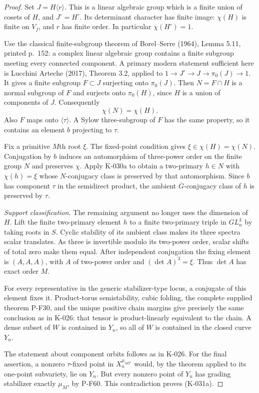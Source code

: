 \begin{proof}
Set $J=H\langle r\rangle$.  This is a linear algebraic group
which is a finite union of cosets of $H$, and $J^\circ=H^\circ$.
Its determinant character has finite image: $\chi(H)$ is finite
on $V_f$, and $r$ has finite order.  In particular
$\chi(H^\circ)=1$.

Use the classical finite-subgroup theorem of Borel--Serre
(1964), Lemma 5.11, printed p.~152: a complex linear algebraic
group contains a finite subgroup meeting every connected
component.  A primary modern statement sufficient
here is Lucchini Arteche (2017), Theorem 3.2, applied to
$1\to J^\circ\to J\to\pi_0(J)\to1$.  It gives a finite
subgroup $F\subset J$ surjecting onto $\pi_0(J)$.
Then $N=F\cap H$ is a normal subgroup of $F$ and surjects onto
$\pi_0(H)$, since $H$ is a union of components of $J$.
Consequently
\[
                       \chi(N)=\chi(H).
                                                        \tag{K-031b}
\]
Also $F$ maps onto $\langle\tau\rangle$.  A Sylow
three-subgroup of $F$ has the same property, so it contains
an element $b$ projecting to $\tau$.

Fix a primitive $M$th root $\xi$.  The fixed-point condition
gives $\xi\in\chi(H)=\chi(N)$.  Conjugation by $b$ induces
an automorphism of three-power order on the finite group $N$
and preserves $\chi$.  Apply K-030a to obtain a two-primary
$h\in N$ with $\chi(h)=\xi$ whose $N$-conjugacy class is
preserved by that automorphism.  Since $b$ has component $\tau$
in the semidirect product, the ambient $\overline G$-conjugacy
class of $h$ is preserved by $\tau$.

\emph{Support classification.}
The remaining argument no longer uses the dimension of $H$.
Lift the finite two-primary element $h$ to a finite two-primary
triple in $GL_n^3$ by taking roots in $S$.  Cyclic stability
of its ambient class makes its three spectra scalar translates.
As three is invertible modulo its two-power order, scalar shifts
of total zero make them equal.  After independent conjugation
the fixing element is $(A,A,A)$, with $A$ of two-power order
and $(\det A)^3=\xi$.  Thus $\det A$ has exact order $M$.

For every representative in the generic stabilizer-type locus,
a conjugate of this element fixes it.  Product-torus
semistability, cubic folding, the complete supplied theorem
P-F30, and the unique positive chain margins give precisely
the same conclusion as in K-026: that tensor is product-linearly
equivalent to the chain.  A dense subset of $W$ is contained
in $Y_n$, so all of $W$ is contained in the closed curve $Y_n$.

The statement about component orbits follows as in K-026.
For the final assertion, a nonzero $\tau$-fixed point in
$X_n^{\mu_{M3^a}}$ would, by the theorem applied to its one-point
subvariety, lie on $Y_n$.  But every nonzero point of $Y_n$ has
grading stabilizer exactly $\mu_M$, by P-F60.  This contradiction
proves (K-031a).
\end{proof}

